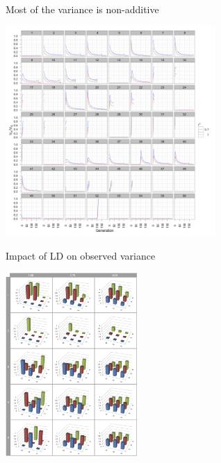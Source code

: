 \documentclass{beamer}
\begin{document}
\begin{frame}{Most of the variance is non-additive}
\begin{center}
\includegraphics[width=8cm]{sup_propadditive_det.png}
\end{center}
\end{frame}

\begin{frame}{Impact of LD on observed variance}
\begin{center}
\includegraphics[width=5cm]{gpmaps_ld.png} \\
\end{center}
\end{frame}
\end{document}
